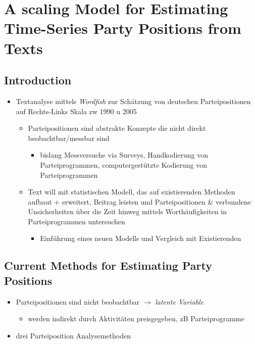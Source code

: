 \documentclass[11pt]{article}
\date{\today}
\title{}
\begin{document}
\tableofcontents

\section{A scaling Model for Estimating Time-Series Party Positions from Texts}
\label{sec:org22c046a}
\subsection{Introduction}
\label{sec:org810fd92}
\begin{itemize}
\item Textanalyse mittels \emph{Wordfish} zur Schätzung von deutschen Parteipositionen auf Rechts-Links Skala zw 1990 u 2005
\begin{itemize}
\item Parteipositionen sind abstrakte Konzepte die nicht direkt beobachtbar/messbar sind
\begin{itemize}
\item bislang Messversuche via Surveys, Handkodierung von Parteiprogrammen, computergestützte Kodierung von Parteiprogrammen
\end{itemize}
\item Text will mit statistischen Modell, das auf existierenden Methoden aufbaut + erweitert, Beitrag leisten und Parteipositionen \& verbundene Unsicherheiten über die Zeit hinweg mittels Worthäufigkeiten in Parteiprogrammen untersuchen
\begin{itemize}
\item Einführung eines neuen Modells und Vergleich mit Existierenden
\end{itemize}
\end{itemize}
\end{itemize}
\subsection{Current Methods for Estimating Party Positions}
\label{sec:org90f15cc}
\begin{itemize}
\item Parteipositionen sind nicht beobachtbar \(\rightarrow\) \emph{latente Variable}
\begin{itemize}
\item werden indirekt durch Aktivitäten preisgegeben, zB Parteiprogramme
\end{itemize}
\item drei Parteiposition Analysemethoden
\end{itemize}
\end{document}
